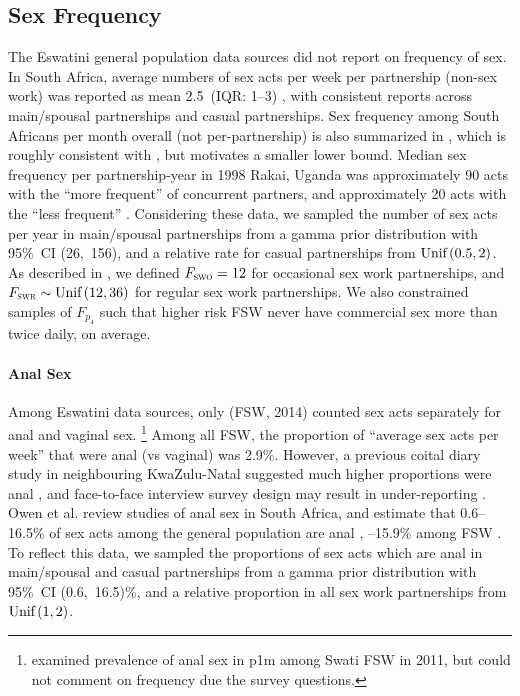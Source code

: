 \subsection{Sex Frequency}\label{mod.par.fsex}
The Eswatini general population data sources \cite{SDHS2006,SHIMS1,SHIMS2}
did not report on frequency of sex. %
In South Africa, average numbers of sex acts per week per partnership (non-sex work)
was reported as mean 2.5~(IQR: 1--3) \cite{Delva2013},
with consistent reports across main/spousal partnerships and casual partnerships.
Sex frequency among South Africans per month overall (not per-partnership)
is also summarized in \cite[Figure~3.15]{Shisana2005},
which is roughly consistent with \cite{Delva2013}, but motivates a smaller lower bound.
Median sex frequency per partnership-year in 1998 Rakai, Uganda was
approximately 90 acts with the ``more frequent'' of concurrent partners, and
approximately 20 acts with the ``less frequent'' \cite{Morris2010}.
Considering these data,
we sampled the number of sex acts per year in main/spousal partnerships
from a gamma prior distribution with 95\%~CI (26,~156),
and a relative rate for casual partnerships from $\textnormal{Unif}\,(0.5,2)$.
As described in ,
we defined $F_{\textsc{swo}} = 12$ for occasional sex work partnerships,
and $F_{\textsc{swr}} \sim \textnormal{Unif}\,(12,36)$ for regular sex work partnerships.
We also constrained samples of $F_{p_{4}}$ such that
higher risk FSW never have commercial sex more than twice daily, on average.
\paragraph{Anal Sex}
Among Eswatini data sources, only \cite{EswKP2014} (FSW, 2014)
counted sex acts separately for anal and vaginal sex.%
\footnote{\citet{Owen2020esw} examined prevalence of anal sex in p1m among Swati FSW in 2011,
  but could not comment on frequency due the survey questions.}
Among all FSW, the proportion of ``average sex acts per week'' that were anal (vs vaginal) was 2.9\%.
However, a previous coital diary study in neighbouring KwaZulu-Natal suggested
much higher proportions were anal \cite{Ramjee1999},
and face-to-face interview survey design may result in under-reporting \cite{Owen2020sr}.
Owen et al. review studies of anal sex in South Africa, and estimate that
0.6--16.5\% of sex acts among the general population are anal \cite{Owen2017}, --15.9\% among FSW \cite{Owen2020sr}.
To reflect this data, we sampled the proportions of sex acts which are anal
in main/spousal and casual partnerships from
a gamma prior distribution with 95\%~CI (0.6,~16.5)\%,
and a relative proportion in all sex work partnerships from $\textnormal{Unif}\,(1,2)$.
